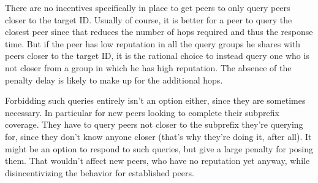 There are no incentives specifically in place to get peers to only query peers
closer to the target ID. Usually of course, it is better for a peer to query the
closest peer since that reduces the number of hops required and thus the
response time. But if the peer has low reputation in all the query groups he
shares with peers closer to the target ID, it is the rational choice to instead
query one who is not closer from a group in which he has high reputation. The
absence of the penalty delay is likely to make up for the additional hops.

Forbidding such queries entirely isn't an option either, since they are
sometimes necessary. In particular for new peers looking to complete their
subprefix coverage. They have to query peers not closer to the subprefix they're
querying for, since they don't know anyone closer (that's why they're doing it,
after all). It might be an option to respond to such queries, but give a large
penalty for posing them. That wouldn't affect new peers, who have no reputation
yet anyway, while disincentivizing the behavior for established peers.
